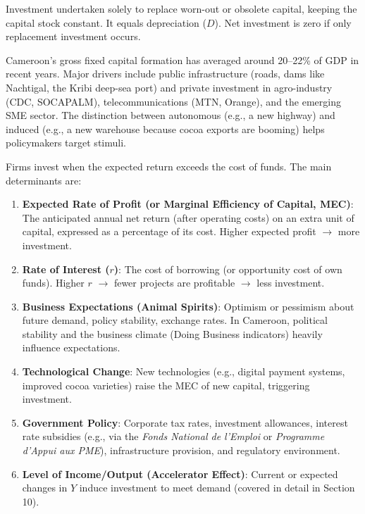 \documentclass[11pt]{article}
\newcounter{popsec}
\newcounter{popsub}
\newcommand{\courssub}[1]{%
  \stepcounter{popsub}%
  \par\vspace{9pt}\noindent{\popxbold\fontsize{11.5}{13}\selectfont\color{popink}{\color{poporange}\thepopsec.\thepopsub}\hspace{6pt}#1}\par\nopagebreak\vspace{4pt}
}
\begin{document}
\begin{definition}
Investment undertaken solely to replace worn-out or obsolete capital, keeping the capital stock constant. It equals depreciation ($D$). Net investment is zero if only replacement investment occurs.
\end{definition}

\begin{savaistu}
Cameroon's gross fixed capital formation has averaged around 20--22\% of GDP in recent years. Major drivers include public infrastructure (roads, dams like Nachtigal, the Kribi deep-sea port) and private investment in agro-industry (CDC, SOCAPALM), telecommunications (MTN, Orange), and the emerging SME sector. The distinction between autonomous (e.g., a new highway) and induced (e.g., a new warehouse because cocoa exports are booming) helps policymakers target stimuli.
\end{savaistu}

\courssub{Determinants of investment}

Firms invest when the expected return exceeds the cost of funds. The main determinants are:

\begin{propriete}
\begin{enumerate}
    \item \textbf{Expected Rate of Profit (or Marginal Efficiency of Capital, MEC)}: The anticipated annual net return (after operating costs) on an extra unit of capital, expressed as a percentage of its cost. Higher expected profit $\rightarrow$ more investment.
    \item \textbf{Rate of Interest ($r$)}: The cost of borrowing (or opportunity cost of own funds). Higher $r$ $\rightarrow$ fewer projects are profitable $\rightarrow$ less investment.
    \item \textbf{Business Expectations (Animal Spirits)}: Optimism or pessimism about future demand, policy stability, exchange rates. In Cameroon, political stability and the business climate (Doing Business indicators) heavily influence expectations.
    \item \textbf{Technological Change}: New technologies (e.g., digital payment systems, improved cocoa varieties) raise the MEC of new capital, triggering investment.
    \item \textbf{Government Policy}: Corporate tax rates, investment allowances, interest rate subsidies (e.g., via the \emph{Fonds National de l'Emploi} or \emph{Programme d'Appui aux PME}), infrastructure provision, and regulatory environment.
    \item \textbf{Level of Income/Output (Accelerator Effect)}: Current or expected changes in $Y$ induce investment to meet demand (covered in detail in Section 10).
\end{enumerate}
\end{propriete}
\end{document}
